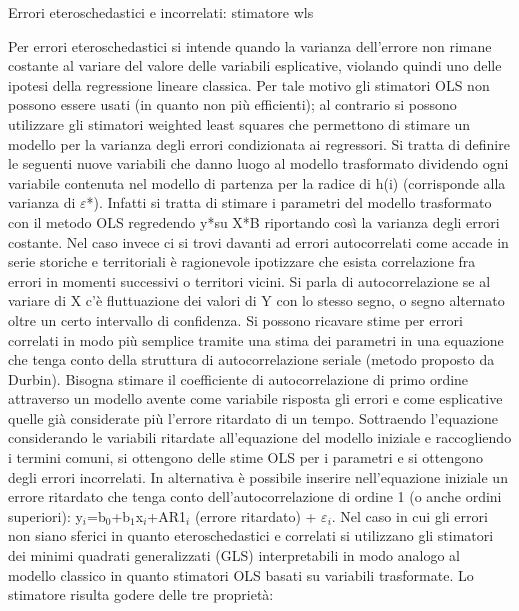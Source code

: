 \documentclass[a4page, 11pt]{article}
\begin{document}
\begin{itshape}
Errori eteroschedastici e incorrelati: stimatore wls
\end{itshape}
\newline
Per errori eteroschedastici si intende quando la varianza dell’errore non rimane costante al variare del valore delle variabili esplicative, violando quindi uno delle ipotesi della regressione lineare classica. Per tale motivo gli stimatori OLS non possono essere usati (in quanto non più efficienti); al contrario si possono utilizzare gli stimatori weighted least squares che permettono di stimare un modello per la varianza degli errori condizionata ai regressori. Si tratta di definire le seguenti nuove variabili che danno luogo al modello trasformato dividendo ogni variabile contenuta nel modello di partenza per la radice di h(i) (corrisponde alla varianza di $\varepsilon$*). Infatti si tratta di stimare i parametri del modello trasformato con il metodo OLS regredendo y*su X*B riportando così la varianza degli errori costante.
\newline
Nel caso invece ci si trovi davanti ad errori autocorrelati come accade in serie storiche e territoriali è ragionevole ipotizzare che esista correlazione fra errori in momenti successivi o territori vicini. Si parla di autocorrelazione se al variare di X c'è fluttuazione dei valori di Y con lo stesso segno, o segno alternato oltre un certo intervallo di confidenza. Si possono ricavare stime per errori correlati in modo più semplice tramite una stima dei parametri in una equazione che tenga conto della struttura di autocorrelazione seriale (metodo proposto da Durbin). Bisogna stimare il coefficiente di autocorrelazione di primo ordine attraverso un modello avente come variabile risposta gli errori e come esplicative quelle già considerate più l’errore ritardato di un tempo. Sottraendo l’equazione considerando le variabili ritardate all’equazione del modello iniziale e raccogliendo i termini comuni, si ottengono delle stime OLS per i parametri e si ottengono degli errori incorrelati. In alternativa è possibile inserire nell’equazione iniziale un errore ritardato che tenga conto dell’autocorrelazione di ordine 1 (o anche ordini superiori): 
\newline
y$_i$=b$_0$+b$_1$x$_i$+AR1$_i$ (errore ritardato) + $\varepsilon_i$. 
\newline
Nel caso in cui gli errori non siano sferici in quanto eteroschedastici e correlati si utilizzano gli stimatori dei minimi quadrati generalizzati (GLS) interpretabili in modo analogo al modello classico in quanto stimatori OLS basati su variabili trasformate. Lo stimatore risulta godere delle tre proprietà:
\end{document}
